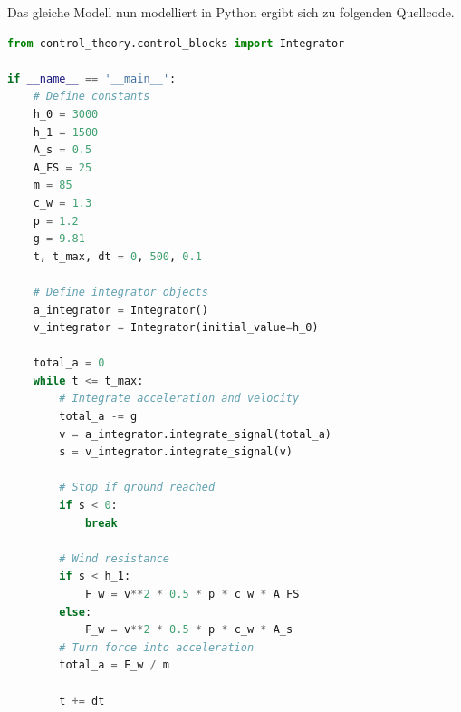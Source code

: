 \documentclass[]{iat}
\begin{document}
Das gleiche Modell nun modelliert in Python ergibt sich zu folgenden Quellcode.

\begin{lstlisting}[language=Python]
from control_theory.control_blocks import Integrator

if __name__ == '__main__':
    # Define constants
    h_0 = 3000
    h_1 = 1500
    A_s = 0.5
    A_FS = 25
    m = 85
    c_w = 1.3
    p = 1.2
    g = 9.81
    t, t_max, dt = 0, 500, 0.1

    # Define integrator objects
    a_integrator = Integrator()
    v_integrator = Integrator(initial_value=h_0)

    total_a = 0
    while t <= t_max:
        # Integrate acceleration and velocity
        total_a -= g
        v = a_integrator.integrate_signal(total_a)
        s = v_integrator.integrate_signal(v)

        # Stop if ground reached
        if s < 0:
            break

        # Wind resistance
        if s < h_1:
            F_w = v**2 * 0.5 * p * c_w * A_FS
        else:
            F_w = v**2 * 0.5 * p * c_w * A_s
        # Turn force into acceleration
        total_a = F_w / m

        t += dt

\end{lstlisting}
\end{document}
